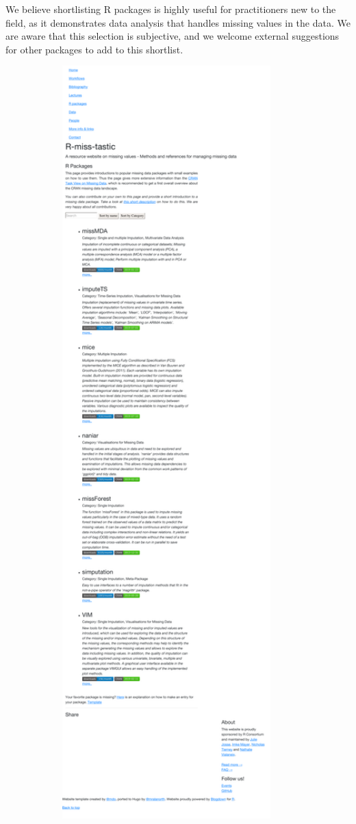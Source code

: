 We believe shortlisting {R} packages is highly useful for
practitioners new to the field, as it demonstrates data analysis that handles  
missing values in the data. We are aware that this selection is subjective, and we
welcome external suggestions for other packages to add to this shortlist.

\begin{figure}
\begin{center}
\begin{subfigure}[b]{0.575\textwidth}
\includegraphics[width=0.9\textwidth]{figures/local-packages.pdf}

\end{subfigure}
\end{center}
\end{figure}
